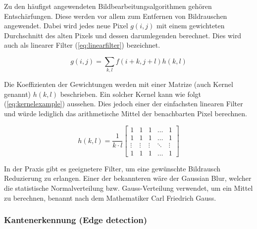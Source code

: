 Zu den häufigst angewendeten Bildbearbeitungsalgorithmen gehören Entschärfungen. Diese werden vor allem zum Entfernen von Bildrauschen angewendet. Dabei wird jedes neue Pixel $g(i,j)$ mit einem gewichteten Durchschnitt des alten Pixels und dessen darumlegenden berechnet. Dies wird auch als linearer Filter (\ref{eq:linearfilter}) bezeichnet. \cite{opencv_bradski_kaehler:1, opencv_doc_blur:1}

\begin{equation}
	g(i,j) = \sum_{k,l} f(i+k,j+l)h(k,l)
	\label{eq:linearfilter}
\end{equation}
\cite{opencv_doc_blur:1}

Die Koeffizienten der Gewichtungen werden mit einer Matrize (auch Kernel genannt) $h(k,l)$ beschrieben. Ein solcher Kernel kann wie folgt (\ref{eq:kernelexample}) aussehen. Dies jedoch einer der einfachsten linearen Filter und würde lediglich das arithmetische Mittel der benachbarten Pixel berechnen.

\begin{equation}
	h(k,l) = \frac{1}{k \cdot l}
	\begin{bmatrix}
  	1      & 1      & 1      & \dots  &      1 \\
    1      & 1      & 1      & \dots  &      1 \\
    \vdots & \vdots & \vdots & \ddots & \vdots \\
    1      & 1      & 1      & \dots  &      1
	\end{bmatrix}	
	\label{eq:kernelexample}
\end{equation}
\cite{opencv_doc_blur:1}

In der Praxis gibt es geeignetere Filter, um eine gewünschte Bildrausch Reduzierung zu erlangen. Einer der bekannteren wäre der Gaussian Blur, welcher die statistische Normalverteilung bzw. Gauss-Verteilung verwendet, um ein Mittel zu berechnen, benannt nach dem Mathematiker Carl Friedrich Gauss. \cite{carlfriedrichgauss:1}

\subsubsection{Kantenerkennung (Edge detection)}

